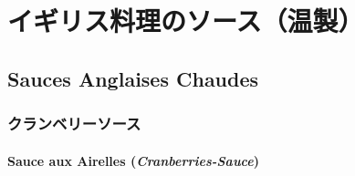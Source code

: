 \hypertarget{ux30a4ux30aeux30eaux30b9ux6599ux7406ux306eux30bdux30fcux30b9ux6e29ux88fd}{%
\section{イギリス料理のソース（温製）}\label{ux30a4ux30aeux30eaux30b9ux6599ux7406ux306eux30bdux30fcux30b9ux6e29ux88fd}}

\hypertarget{sauces-anglaises-chaudes}{%
\subsection{Sauces Anglaises Chaudes}\label{sauces-anglaises-chaudes}}
\begin{recette}
\hypertarget{ux30afux30e9ux30f3ux30d9ux30eaux30fcux30bdux30fcux30b9}{%
\subsubsection{クランベリーソース}\label{ux30afux30e9ux30f3ux30d9ux30eaux30fcux30bdux30fcux30b9}}

\hypertarget{cranberries-sauce}{%
\paragraph{\texorpdfstring{Sauce aux Airelles
(\emph{Cranberries-Sauce})}{Sauce aux Airelles (Cranberries-Sauce)}}\label{cranberries-sauce}}

\end{recette}